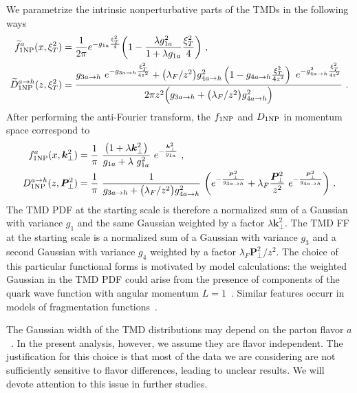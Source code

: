 \documentclass[aps,preprintnumbers,showpacs,nofootinbib,superscriptaddress,floatfix]{revtex4}
\newcommand{\T}{\perp}
\newcommand{\bT}{\xi_T}
\begin{document}
We parametrize the intrinsic nonperturbative parts of the TMDs in the
following ways
\begin{align}
\widetilde{f}_{1 {\rm NP}}^a (x, \bT^2) &= \frac{1}{2\pi}
        e^{-g_{1a} \frac{\bT^2}{4}}
        \bigg( 1 - \frac{\lambda  g_{1a}^{2}}{1+\lambda g_{1a}}  \frac{\bT^2}{4} \bigg)\  ,
\label{e:f1NP} \\
\widetilde{D}_{1 {\rm NP}}^{a \to h} (z, \bT^2) &= 
    \frac{ g_{3 a\to h} \   e^{-g_{3 a\to h} \frac{\bT^2}{4 z^2}}
        + \big(\lambda_F/z^2\big)    g_{4 a\to h}^{2}
    \left(1 - g_{4 a\to h} \frac{\bT^2}{4 z^2} \right)
         \  e^{- g_{4 a\to h}^{2}  \frac{\bT^2}{4z^2}}}
     {2 \pi z^2 \Big(g_{3 a\to h} + \big(\lambda_F/z^2\big)    g_{4 a\to h}^{2}\Big)} \  .
\label{e:D1NP}
\end{align} 
After performing the anti-Fourier transform, the $f_{1 \rm NP}$ and $D_{1\rm
  NP}$ in momentum space correspond to 
\begin{align} 
f_{1 {\rm NP}}^a (x, \bm{k}_{\T}^2) &= \frac{1}{\pi} \  
                        \frac{\big( 1 +\lambda \bm{k}_{\T}^2\big)}
                                { g_{1a} +\lambda \   g_{1a}^2}
                        \  e^{- \frac{\bm{k}_{\T}^2}{g_{1a}}} \  ,
\label{e:f1NPk}   \\
D_{1 {\rm NP}}^{a\to h} (z, \bm{P}_{\T}^2) &=  \frac{1}{\pi} \   
                  \frac{1}{g_{3 a\to h} +
                    \big(\lambda_F/z^2\big) g_{4 a \to h}^{2}}
           \   \bigg( e^{- \frac{\bm{P}_{\T}^2}{g_{3 a \to h}}}
                            + \lambda_F \frac{\bm{P}_{\T}^2}{z^2} \  
           e^{- \frac{\bm{P}_{\T}^2}{g_{4 a \to h}}} \bigg) \  .
\label{e:D1NPk}
\end{align} 
The TMD PDF at the starting scale is therefore a normalized sum of a Gaussian
with variance $g_1$ and the same Gaussian weighted by a factor $\lambda
\bm{k}_{\T}^2$. The TMD FF at the starting scale is a normalized sum of a Gaussian
with variance $g_3$ and a second Gaussian with variance $g_4$ weighted by a factor $\lambda_F
\bm{P}_{\T}^2/z^2$. 
The choice of this particular functional forms is motivated by model
calculations: the weighted Gaussian in the TMD PDF could arise from 
the presence of components of the quark wave function 
with angular momentum
$L=1$~\cite{Bacchetta:2007wc,Pasquini:2008ax,Avakian:2010br,Bacchetta:2010si,Burkardt:2015qoa}. Similar
features occurr in models of fragmentation functions~\cite{Bacchetta:2002tk,Bacchetta:2007wc,Matevosyan:2011vj}.

The
Gaussian width of the TMD distributions may depend 
on the parton flavor $a$~\cite{Signori:2013mda,Matevosyan:2011vj,Schweitzer:2012hh}. 
In the present analysis, however, we assume they are
flavor independent. The justification for this choice is that most of the data
we are considering are not sufficiently sensitive to flavor differences,
leading to unclear results. We
will devote attention to this issue in further studies.
\end{document}
